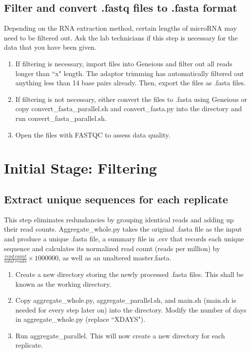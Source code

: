 \documentclass[12pt,titlepage]{article}
\begin{document}
\subsection{Filter and convert .fastq files to .fasta format}
Depending on the RNA extraction method, certain lengths of microRNA may need to be filtered out. Ask the lab technicians if this step is necessary for the data that you have been given.
\begin{enumerate}
\item If filtering is necessary, import files into Geneious and filter out all reads longer than ``x" length. The adaptor trimming has automatically filtered out anything less than 14 base pairs already. Then, export the files as .fasta files.
\item If filtering is not necessary, either convert the files to .fasta using Geneious or copy convert\_fasta\_parallel.sh and convert\_fasta.py into the directory and run convert\_fasta\_parallel.sh. 
\item Open the files with FASTQC to assess data quality. 
\end{enumerate}

\section{Initial Stage: Filtering}

\subsection{Extract unique sequences for each replicate}
This step eliminates redundancies by grouping identical reads and adding up their read counts. Aggregate\_whole.py takes the original .fasta file as the input and produce a unique .fasta file, a summary file in .csv that records each unique sequence and calculates its normalized read count (reads per million) by $\frac{read\,count}{total\,reads}\times1000000$, as well as an unaltered master.fasta.
\begin{enumerate}
\item Create a new directory storing the newly processed .fasta files. This shall be known as the working directory.
\item Copy aggregate\_whole.py, aggregate\_parallel.sh, and main.sh (main.sh is needed for every step later on) into the directory. Modify the number of days in aggregate\_whole.py (replace ``XDAYS").
\item Run aggregate\_parallel. This will now create a new directory for each replicate.
\end{enumerate}
\end{document}
